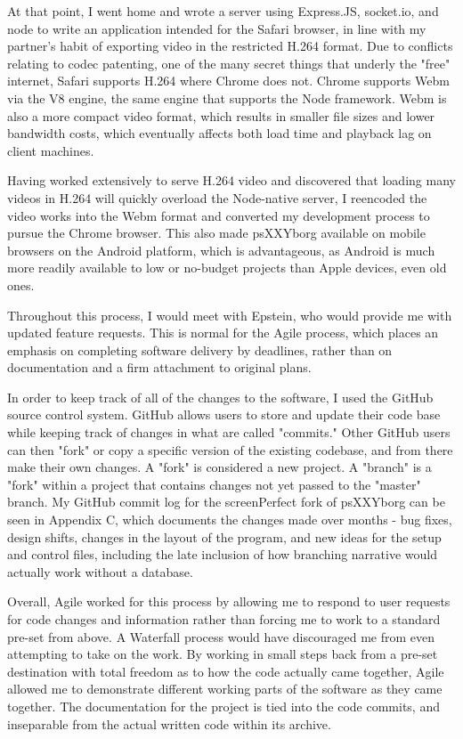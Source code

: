 At that point, I went home and wrote a server using Express.JS, socket.io, and node to write an application intended for the Safari browser, in line with my partner's habit of exporting video in the restricted H.264 format. Due to conflicts relating to codec patenting, one of the many secret things that underly the "free" internet, Safari supports H.264 where Chrome does not. Chrome supports Webm via the V8 engine, the same engine that supports the Node framework. Webm is also a more compact video format, which results in smaller file sizes and lower bandwidth costs, which eventually affects both load time and playback lag on client machines. 

Having worked extensively to serve H.264 video and discovered that loading many videos in H.264 will quickly overload the Node-native server, I reencoded the video works into the Webm format and converted my development process to pursue the Chrome browser. This also made psXXYborg available on mobile browsers on the Android platform, which is advantageous, as Android is much more readily available to low or no-budget projects than Apple devices, even old ones.

Throughout this process, I would meet with Epstein, who would provide me with updated feature requests. This is normal for the Agile process, which places an emphasis on completing software delivery by deadlines, rather than on documentation and a firm attachment to original plans. 

In order to keep track of all of the changes to the software, I used the GitHub source control system. GitHub allows users to store and update their code base while keeping track of changes in what are called "commits." Other GitHub users can then "fork" or copy a specific version of the existing codebase, and from there make their own changes. A "fork" is considered a new project. A "branch" is a "fork" within a project that contains changes not yet passed to the "master" branch. My GitHub commit log for the screenPerfect fork of psXXYborg can be seen in Appendix C, which documents the changes made over months - bug fixes, design shifts, changes in the layout of the program, and new ideas for the setup and control files, including the late inclusion of how branching narrative would actually work without a database.

Overall, Agile worked for this process by allowing me to respond to user requests for code changes and information rather than forcing me to work to a standard pre-set from above. A Waterfall process would have discouraged me from even attempting to take on the work. By working in small steps back from a pre-set destination with total freedom as to how the code actually came together, Agile allowed me to demonstrate different working parts of the software as they came together. The documentation for the project is tied into the code commits, and inseparable from the actual written code within its archive.

